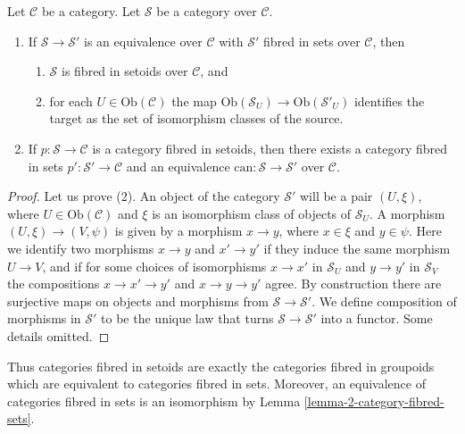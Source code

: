 \begin{lemma}
\label{lemma-setoid-fibres}
Let $\mathcal{C}$ be a category. Let $\mathcal{S}$ be a category
over $\mathcal{C}$.
\begin{enumerate}
\item If $\mathcal{S} \to \mathcal{S}'$ is an equivalence
over $\mathcal{C}$ with $\mathcal{S}'$ fibred in sets over $\mathcal{C}$,
then
\begin{enumerate}
\item $\mathcal{S}$ is fibred in setoids over $\mathcal{C}$, and
\item for each $U \in \text{Ob}(\mathcal{C})$ the map
$\text{Ob}(\mathcal{S}_U) \to \text{Ob}(\mathcal{S}'_U)$
identifies the target as the set of isomorphism classes of the source.
\end{enumerate}
\item If $p : \mathcal{S} \to \mathcal{C}$ is a category fibred in setoids,
then there exists a category fibred in sets
$p' : \mathcal{S}' \to \mathcal{C}$ and an equivalence
$\text{can} : \mathcal{S} \to \mathcal{S}'$ over $\mathcal{C}$.
\end{enumerate}
\end{lemma}

\begin{proof}
Let us prove (2).
An object of the category $\mathcal{S}'$ will be a pair $(U, \xi)$, where
$U \in \text{Ob}(\mathcal{C})$ and $\xi$ is an isomorphism class of objects
of $\mathcal{S}_U$. A morphism $(U, \xi) \to (V , \psi)$ is given by a
morphism $x \to y$, where $x \in \xi$ and $y \in \psi$. Here we identify
two morphisms $x \to y$ and $x' \to y'$ if they induce the same morphism
$U \to V$, and if for some choices of isomorphisms $x \to x'$ in
$\mathcal{S}_U$ and $y \to y'$ in $\mathcal{S}_V$ the compositions
$x \to x' \to y'$ and $x \to y \to y'$ agree. By construction there are
surjective maps on objects and morphisms from $\mathcal{S} \to
\mathcal{S}'$. We define composition of morphisms in $\mathcal{S}'$ to
be the unique law that turns $\mathcal{S} \to \mathcal{S}'$ into a functor.
Some details omitted.
\end{proof}

\noindent
Thus categories fibred in setoids are exactly the categories fibred
in groupoids which are equivalent to categories fibred in sets.
Moreover, an equivalence of categories fibred in sets is an isomorphism
by Lemma \ref{lemma-2-category-fibred-sets}.

